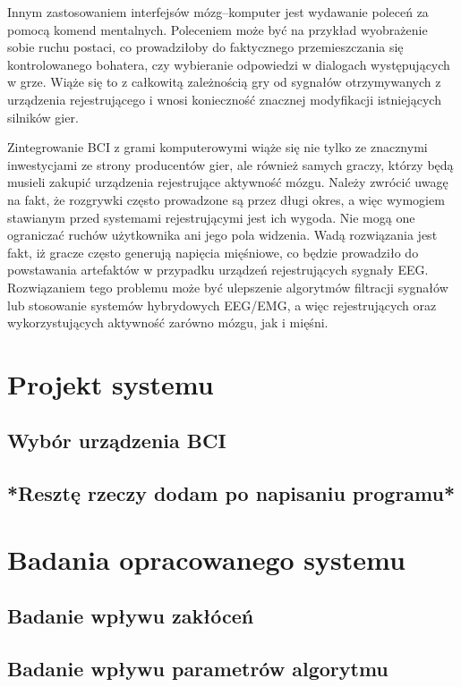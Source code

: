 \documentclass[skorowidz,skroty]{dyplomWEZUT}
\begin{document}
Innym zastosowaniem interfejsów mózg--komputer jest wydawanie poleceń za pomocą komend mentalnych. Poleceniem może być na przykład wyobrażenie sobie ruchu postaci, co prowadziłoby do faktycznego przemieszczania się kontrolowanego bohatera, czy wybieranie odpowiedzi w dialogach występujących w grze. Wiąże się to z całkowitą zależnością gry od sygnałów otrzymywanych z urządzenia rejestrującego i wnosi konieczność znacznej modyfikacji istniejących silników gier.

Zintegrowanie BCI z grami komputerowymi wiąże się nie tylko ze znacznymi inwestycjami ze strony producentów gier, ale również samych graczy, którzy będą musieli zakupić urządzenia rejestrujące aktywność mózgu. Należy zwrócić uwagę na fakt, że rozgrywki często prowadzone są przez długi okres, a więc wymogiem stawianym przed systemami rejestrującymi jest ich wygoda. Nie mogą one ograniczać ruchów użytkownika ani jego pola widzenia. Wadą rozwiązania jest fakt, iż gracze często generują napięcia mięśniowe, co będzie prowadziło do powstawania artefaktów w przypadku urządzeń rejestrujących sygnały EEG. Rozwiązaniem tego problemu może być ulepszenie algorytmów filtracji sygnałów lub stosowanie systemów hybrydowych EEG/EMG, a więc rejestrujących oraz wykorzystujących aktywność zarówno mózgu, jak i mięśni\cite{bci_introduction}.

\chapter{Projekt systemu}
\section{Wybór urządzenia BCI}
\section{*Resztę rzeczy dodam po napisaniu programu*}

\chapter{Badania opracowanego systemu}
\section{Badanie wpływu zakłóceń}
\section{Badanie wpływu parametrów algorytmu}
\end{document}
